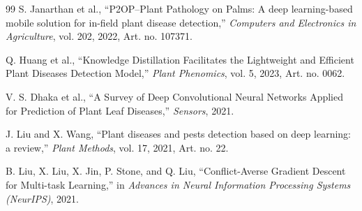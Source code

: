\documentclass[preprint,12pt]{elsarticle}
\begin{document}
\begin{thebibliography}{99}
S. Janarthan et al.,
``P2OP--Plant Pathology on Palms: A deep learning-based mobile
solution for in-field plant disease detection,''
\textit{Computers and Electronics in Agriculture},
vol. 202, 2022, Art. no. 107371.

Q. Huang et al.,
``Knowledge Distillation Facilitates the Lightweight and Efficient
Plant Diseases Detection Model,''
\textit{Plant Phenomics},
vol. 5, 2023, Art. no. 0062.

V. S. Dhaka et al.,
``A Survey of Deep Convolutional Neural Networks Applied for
Prediction of Plant Leaf Diseases,''
\textit{Sensors}, 2021.

J. Liu and X. Wang,
``Plant diseases and pests detection based on deep learning:
a review,''
\textit{Plant Methods},
vol. 17, 2021, Art. no. 22.

B. Liu, X. Liu, X. Jin, P. Stone, and Q. Liu,
``Conflict-Averse Gradient Descent for Multi-task Learning,''
in \textit{Advances in Neural Information Processing Systems
(NeurIPS)}, 2021.

\end{thebibliography}
\end{document}
